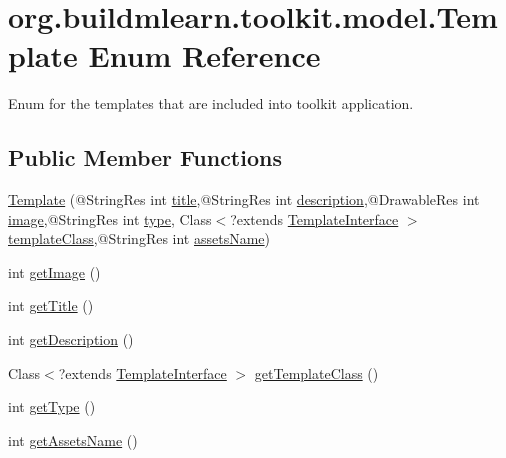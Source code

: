 \hypertarget{enumorg_1_1buildmlearn_1_1toolkit_1_1model_1_1Template}{}\section{org.\+buildmlearn.\+toolkit.\+model.\+Template Enum Reference}
\label{enumorg_1_1buildmlearn_1_1toolkit_1_1model_1_1Template}


Enum for the templates that are included into toolkit application.  


\subsection*{Public Member Functions}
\begin{DoxyCompactItemize}
\item 
\hyperlink{enumorg_1_1buildmlearn_1_1toolkit_1_1model_1_1Template_a0cad2ba8f734a7a46eb4d73404886b4a}{Template} (@String\+Res int \hyperlink{enumorg_1_1buildmlearn_1_1toolkit_1_1model_1_1Template_a112206e1cf6d9b50a0def584ee53529a}{title},@String\+Res int \hyperlink{enumorg_1_1buildmlearn_1_1toolkit_1_1model_1_1Template_a009374cd67d17445cfc0787899697a17}{description},@Drawable\+Res int \hyperlink{enumorg_1_1buildmlearn_1_1toolkit_1_1model_1_1Template_af9b3693a4fd2a12e49bbfa55a6ac2d3a}{image},@String\+Res int \hyperlink{enumorg_1_1buildmlearn_1_1toolkit_1_1model_1_1Template_a1ac0921d037d111c6d9a98c659b6de74}{type}, Class$<$?extends \hyperlink{interfaceorg_1_1buildmlearn_1_1toolkit_1_1model_1_1TemplateInterface}{Template\+Interface} $>$ \hyperlink{enumorg_1_1buildmlearn_1_1toolkit_1_1model_1_1Template_a6a200b7fbb36356e5afe60983256bd68}{template\+Class},@String\+Res int \hyperlink{enumorg_1_1buildmlearn_1_1toolkit_1_1model_1_1Template_a5f0fc0ba241acdfafe1564cfce9e72fb}{assets\+Name})
\item 
int \hyperlink{enumorg_1_1buildmlearn_1_1toolkit_1_1model_1_1Template_a58fe17e72b35d2e3caf83636e477ee1f}{get\+Image} ()
\item 
int \hyperlink{enumorg_1_1buildmlearn_1_1toolkit_1_1model_1_1Template_a7243ccbb7b13ee22a953423bf6059512}{get\+Title} ()
\item 
int \hyperlink{enumorg_1_1buildmlearn_1_1toolkit_1_1model_1_1Template_abacc16481f1b0c6df91e4722aa05e769}{get\+Description} ()
\item 
Class$<$?extends \hyperlink{interfaceorg_1_1buildmlearn_1_1toolkit_1_1model_1_1TemplateInterface}{Template\+Interface} $>$ \hyperlink{enumorg_1_1buildmlearn_1_1toolkit_1_1model_1_1Template_aac65cbf78fd00d3ce6d3e1ec7eb83761}{get\+Template\+Class} ()
\item 
int \hyperlink{enumorg_1_1buildmlearn_1_1toolkit_1_1model_1_1Template_aea52d308cd996ad5927028269e2c6c6d}{get\+Type} ()
\item 
int \hyperlink{enumorg_1_1buildmlearn_1_1toolkit_1_1model_1_1Template_aedb1199de716636d06eeafc5a5455c79}{get\+Assets\+Name} ()
\end{DoxyCompactItemize}
